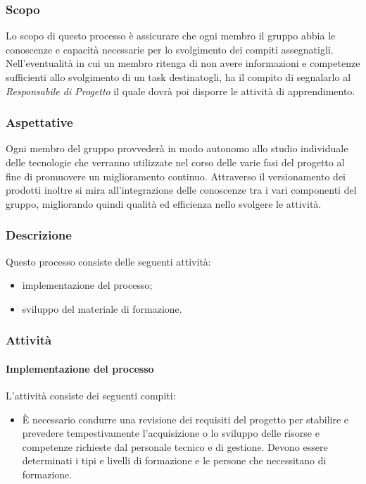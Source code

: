 	\subsubsection{Scopo}
	Lo scopo di questo processo è assicurare che ogni membro il gruppo abbia le conoscenze e capacità necessarie per lo svolgimento dei compiti assegnatigli. Nell'eventualità in cui un membro ritenga di non avere informazioni e competenze sufficienti allo svolgimento di un task destinatogli, ha il compito di segnalarlo al \textit{Responsabile di Progetto} il quale dovrà poi disporre le attività di apprendimento.\\
	\subsubsection{Aspettative}
	Ogni membro del gruppo provvederà in modo autonomo allo studio individuale delle tecnologie che verranno utilizzate nel corso delle varie fasi del progetto al fine di promuovere un miglioramento continuo. Attraverso il versionamento dei prodotti inoltre si mira all'integrazione delle conoscenze tra i vari componenti del gruppo, migliorando quindi qualità ed efficienza nello svolgere le attività.
	
		
		\subsubsection{Descrizione}
		Questo processo consiste delle seguenti attività:
		\begin{itemize}
			\item implementazione del processo;
			\item sviluppo del materiale di formazione.
		\end{itemize}
		\subsubsection{Attività}
		\paragraph{Implementazione del processo}
		L'attività consiste dei seguenti compiti:
		\begin{itemize}
			\item È necessario condurre una revisione dei requisiti del progetto per stabilire e prevedere tempestivamente l'acquisizione o lo sviluppo delle risorse e competenze richieste dal personale tecnico e di gestione. Devono essere determinati i tipi e livelli di formazione e le persone che necessitano di formazione. 
		\end{itemize}
